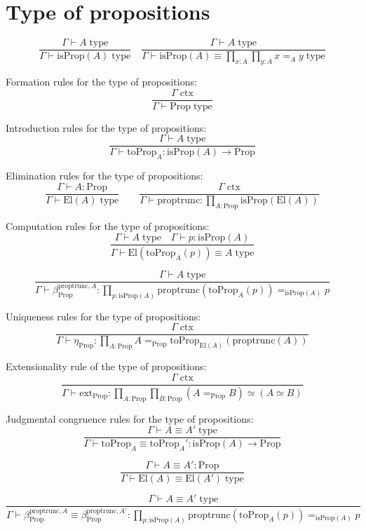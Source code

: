\documentclass{book}
\begin{document}
\section{Type of propositions}

$$\frac{\Gamma \vdash A \; \mathrm{type}}{\Gamma \vdash \mathrm{isProp}(A) \; \mathrm{type}} \quad \frac{\Gamma \vdash A \; \mathrm{type}}{\Gamma \vdash \mathrm{isProp}(A) \equiv \prod_{x:A} \prod_{y:A} x =_A y \; \mathrm{type}}$$

Formation rules for the type of propositions:
$$\frac{\Gamma \; \mathrm{ctx}}{\Gamma \vdash \mathrm{Prop} \; \mathrm{type}}$$

Introduction rules for the type of propositions:
$$\frac{\Gamma \vdash A \; \mathrm{type}}{\Gamma \vdash \mathrm{toProp}_A:\mathrm{isProp}(A) \to \mathrm{Prop}}$$

Elimination rules for the type of propositions:
$$\frac{\Gamma \vdash A:\mathrm{Prop}}{\Gamma \vdash \mathrm{El}(A) \; \mathrm{type}} \qquad \frac{\Gamma \; \mathrm{ctx}}{\Gamma \vdash \mathrm{proptrunc}:\prod_{A:\mathrm{Prop}} \mathrm{isProp}(\mathrm{El}(A))}$$

Computation rules for the type of propositions:
$$\frac{\Gamma \vdash A \; \mathrm{type} \quad \Gamma \vdash p:\mathrm{isProp}(A)}{\Gamma \vdash \mathrm{El}(\mathrm{toProp}_A(p)) \equiv A \; \mathrm{type}}$$

$$\frac{\Gamma \vdash A \; \mathrm{type}}{\Gamma \vdash \beta_\mathrm{Prop}^{\mathrm{proptrunc},A}:\prod_{p:\mathrm{isProp}(A)} \mathrm{proptrunc}(\mathrm{toProp}_A(p)) =_{\mathrm{isProp}(A)} p}$$

Uniqueness rules for the type of propositions:
$$\frac{\Gamma \; \mathrm{ctx}}{\Gamma \vdash \eta_{\mathrm{Prop}}:\prod_{A:\mathrm{Prop}} A =_{\mathrm{Prop}} \mathrm{toProp}_{\mathrm{El}(A)}(\mathrm{proptrunc}(A))}$$

Extensionality rule of the type of propositions:
$$\frac{\Gamma \; \mathrm{ctx}}{\Gamma \vdash \mathrm{ext}_{\mathrm{Prop}}:\prod_{A:\mathrm{Prop}} \prod_{B:\mathrm{Prop}} (A =_{\mathrm{Prop}} B) \simeq (A \simeq B)}$$

Judgmental congruence rules for the type of propositions:
$$\frac{\Gamma \vdash A \equiv A' \; \mathrm{type}}{\Gamma \vdash \mathrm{toProp}_A \equiv \mathrm{toProp}_A':\mathrm{isProp}(A) \to \mathrm{Prop}}$$

$$\frac{\Gamma \vdash A \equiv A':\mathrm{Prop}}{\Gamma \vdash \mathrm{El}(A) \equiv \mathrm{El}(A') \; \mathrm{type}}$$

$$\frac{\Gamma \vdash A \equiv A' \; \mathrm{type}}{\Gamma \vdash \beta_\mathrm{Prop}^{\mathrm{proptrunc},A} \equiv \beta_\mathrm{Prop}^{\mathrm{proptrunc},A'}:\prod_{p:\mathrm{isProp}(A)} \mathrm{proptrunc}(\mathrm{toProp}_A(p)) =_{\mathrm{isProp}(A)} p}$$
\end{document}

